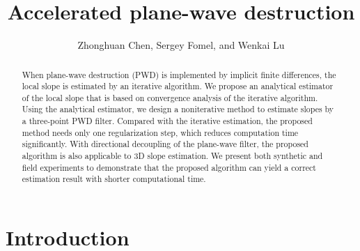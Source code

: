 
\title{Accelerated plane-wave destruction}

\address{
\footnotemark[1] Department of Automation,\\
State Key Laboratory of Intelligent Technology and Systems\\
Tsinghua National Laboratory for Information Science and Technology \\
Tsinghua University \\
Beijing, China. 100084 \\
Email: zhonghuanchen@gmail.com. \\
\footnotemark[2]Bureau of Economic Geology, \\
Jackson School of Geosciences \\
The University of Texas at Austin \\
University Station, Box X \\
Austin, TX 78713-8924\\
Email: sergey.fomel@beg.utexas.edu. 
}

\author{Zhonghuan Chen\footnotemark[1],
 Sergey Fomel\footnotemark[2], and Wenkai Lu\footnotemark[1]}

\maketitle

\begin{abstract}
When plane-wave destruction (PWD) is implemented by implicit finite differences,
the local slope is estimated by an iterative algorithm.
We propose an analytical estimator of the local slope 
that is based on convergence analysis of the iterative algorithm. 
Using the analytical estimator, 
we design a noniterative method 
to estimate slopes by a three-point PWD filter.
Compared with the iterative estimation, 
the proposed method needs only one regularization step,
which reduces computation time significantly.
With directional decoupling of the plane-wave filter,
the proposed algorithm is also applicable to 3D slope estimation.
We present both synthetic and field
experiments to demonstrate that the proposed algorithm can yield
a correct estimation result with shorter computational time.
\end{abstract}

\section{Introduction}

